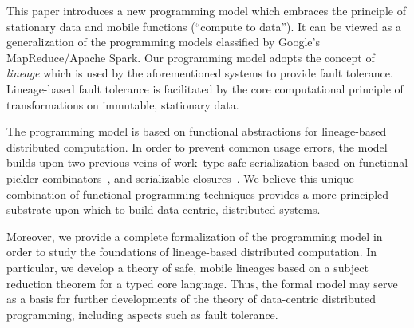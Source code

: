 \documentclass{article}
\begin{document}
This paper introduces a new programming model which embraces the principle of stationary data and mobile functions (``compute to data''). It can be viewed as a generalization of the programming models classified by Google's MapReduce/Apache Spark. Our programming model adopts the concept of {\em lineage} which is used by the aforementioned systems to provide fault tolerance. Lineage-based fault tolerance is facilitated by the core computational principle of transformations on immutable, stationary data.

The programming model is based on functional abstractions for lineage-based distributed computation. In order to prevent common usage errors, the model builds upon two previous veins of work--type-safe serialization based on functional pickler combinators~\cite{Kennedy,Elsman,Pickling,AliceML}, and serializable closures~\cite{CloudHaskell,Spores}. We believe this unique combination of functional programming techniques provides a more principled substrate upon which to build data-centric, distributed systems.

Moreover, we provide a complete formalization of the programming model in order to study the foundations of lineage-based distributed computation. In particular, we develop a theory of safe, mobile lineages based on a subject reduction theorem for a typed core language. Thus, the formal model may serve as a basis for further developments of the theory of data-centric distributed programming, including aspects such as fault tolerance.

\end{document}
